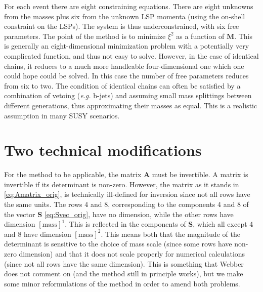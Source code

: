 \documentclass[twoside,english]{uiofysmaster}
\begin{document}
For each event there are eight constraining equations. There are eight unknowns from the masses plus six from the unknown LSP momenta (using the on-shell constraint on the LSPs). The system is thus underconstrained, with six free parameters. The point of the method is to minimize $\xi^2$ as a function of $\mathbf{M}$. This is generally an eight-dimensional minimization problem with a potentially very complicated function, and thus not easy to solve. However, in the case of identical chains, it reduces to a much more handleable four-dimensional one which one could hope could be solved. In this case the number of free parameters reduces from six to two. The condition of identical chains can often be satisfied by a combination of vetoing ({\it e.g.} b-jets) and assuming small mass splittings between different generations, thus approximating their masses as equal. This is a realistic assumption in many SUSY scenarios.

\section{Two technical modifications}\label{sec:dimension_fixing}
For the method to be applicable, the matrix $\mathbf{A}$ must be invertible. A matrix is invertible if its determinant is non-zero. However, the matrix as it stands in \eqref{eq:Amatrix_orig}, is technically ill-defined for inversion since not all rows have the same units. The rows 4 and 8, corresponding to the components 4 and 8 of the vector $\mathbf{S}$ \eqref{eq:Svec_orig}, have no dimension, while the other rows have dimension $[\mathrm{mass}]^1$. This is reflected in the components of $\mathbf{S}$, which all except 4 and 8 have dimension $[\mathrm{mass}]^2$. This means both that the magnitude of the determinant is sensitive to the choice of mass scale (since some rows have non-zero dimension) and that it does not scale properly for numerical calculations (since not all rows have the same dimension). This is something that Webber does not comment on (and the method still in principle works), but we make some minor reformulations of the method in order to amend both problems.
\end{document}
